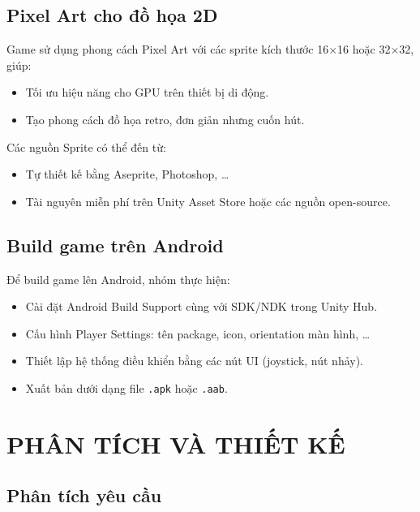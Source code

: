\documentclass[a4paper,12pt]{article}
\begin{document}
\subsection{Pixel Art cho đồ họa 2D}

Game sử dụng phong cách Pixel Art với các sprite kích thước 16$\times$16 hoặc 32$\times$32, giúp:
\begin{itemize}
    \item Tối ưu hiệu năng cho GPU trên thiết bị di động.
    \item Tạo phong cách đồ họa retro, đơn giản nhưng cuốn hút.
\end{itemize}

Các nguồn Sprite có thể đến từ:
\begin{itemize}
    \item Tự thiết kế bằng Aseprite, Photoshop, \ldots
    \item Tài nguyên miễn phí trên Unity Asset Store hoặc các nguồn open-source.
\end{itemize}

\subsection{Build game trên Android}

Để build game lên Android, nhóm thực hiện:
\begin{itemize}
    \item Cài đặt Android Build Support cùng với SDK/NDK trong Unity Hub.
    \item Cấu hình Player Settings: tên package, icon, orientation màn hình, \ldots
    \item Thiết lập hệ thống điều khiển bằng các nút UI (joystick, nút nhảy).
    \item Xuất bản dưới dạng file \texttt{.apk} hoặc \texttt{.aab}.
\end{itemize}

\newpage

\section{PHÂN TÍCH VÀ THIẾT KẾ}

\subsection{Phân tích yêu cầu}
\end{document}
